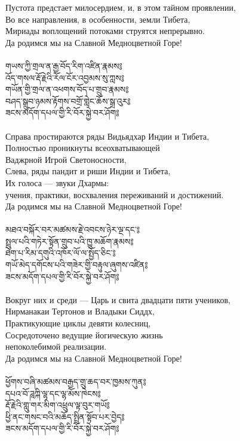 Пустота предстает милосердием, и, в этом тайном проявлении,\\
Во все направления, в особенности, земли Тибета,\\
Мириады воплощений потоками струятся непрерывно.\\
Да родимся мы на Славной Медноцветной Горе!\\
\\
\newpage
{\ti གཡས་ཀྱི་གྲལ་ན་རྒྱ་བོད་རིག་འཛིན་རྣམས༔\\
འོད་གསལ་རྡོ་རྗེའི་རོལ་ངོར་འབྱམས་སུ་ཀླས༔\\
གཡོན་གྱི་གྲལ་ན་འཕགས་བོད་པ་གྲུབ་རྣམས༔\\
བཤད་སྒྲུབ་ཉམས་རྟོགས་བགྲོ་གླེང་ཆོས་སྒྲ་འུར༔\\
ཟངས་མདོག་དཔལ་གྱི་རི་བོར་སྐྱེ་བར་ཤོག༔}\\
\\
\ru
Справа простираются ряды Видьядхар Индии и Тибета,\\
Полностью проникнуты всеохватывающей \\ \indent Ваджрной Игрой Светоносности,\\
Слева, ряды пандит и риши Индии и Тибета,\\
Их голоса — звуки Дхармы: \\ \indent учения, практики, восхваления переживаний и достижений.\\
Да родимся мы на Славной Медноцветной Горе!\\
\\
{\ti མཐའ་བསྐོར་བར་མཚམས་རྗེ་འབངས་ཉེར་ལྔ་དང་༔\\
སྤྲུལ་པའི་གཏེར་སྟོན་གྲུབ་པའི་ཁྱུ་མཆོག་རྣམས༔\\
ཐེག་པ་རིམ་དགུའི་འཁོར་ལོ་ལ་སྤྱོད་ཅིང་༔\\
གཡོ་མེད་དགོངས་པའི་གཟེར་གྱི་བརྟུལ་ཞུགས་འཛིན༔\\
ཟངས་མདོག་དཔལ་གྱི་རི་བོར་སྐྱེ་བར་ཤོག༔}\\
\\
\ru
Вокруг них и среди — Царь и свита двадцати пяти учеников,\\
Нирманакаи Тертонов и Владыки Сиддх,\\
Практикующие циклы девяти колесниц,\\
Сосредоточено ведущие йогическую жизнь \\ \indent непоколебимой реализации.\\
Да родимся мы на Славной Медноцветной Горе!\\
\\
\newpage
{\ti ཕྱོགས་བཞི་མཚམས་བརྒྱད་གྲུ་ཆད་བར་ཁྱམས་ཀུན༔\\
དཔའ་བོ་ཌཱཀྐི་ལྷ་དང་ལྷ་མོས་ཁེངས༔\\
རྡོ་རྗེའི་གླུ་གར་མིག་འཕྲུལ་ལྟ་བུར་གཡོ༔\\
ཕྱི་ནང་གསང་བའི་མཆོད་སྤྲིན་སྟོབ་པར་བྱེད༔\\
ཟངས་མདོག་དཔལ་གྱི་རི་བོར་སྐྱེ་བར་ཤོག༔}\\
